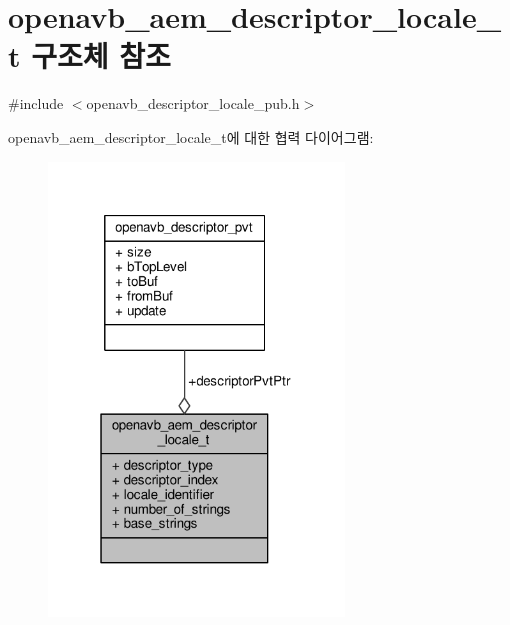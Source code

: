 \hypertarget{structopenavb__aem__descriptor__locale__t}{}\section{openavb\+\_\+aem\+\_\+descriptor\+\_\+locale\+\_\+t 구조체 참조}
\label{structopenavb__aem__descriptor__locale__t}


{\ttfamily \#include $<$openavb\+\_\+descriptor\+\_\+locale\+\_\+pub.\+h$>$}



openavb\+\_\+aem\+\_\+descriptor\+\_\+locale\+\_\+t에 대한 협력 다이어그램\+:
\nopagebreak
\begin{figure}[H]
\begin{center}
\leavevmode
\includegraphics[width=223pt]{structopenavb__aem__descriptor__locale__t__coll__graph}
\end{center}
\end{figure}
